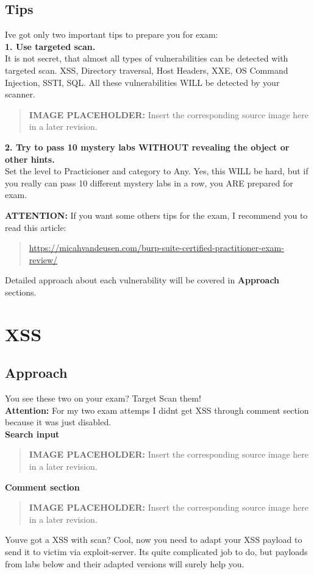 \documentclass[
  letterpaper,
]{article}
\begin{document}
\subsection{Tips}\label{tips}

I\textquotesingle ve got only two important tips to prepare you for
exam:\\
\textbf{1. Use targeted scan.}\\
It is not secret, that almost all types of vulnerabilities can be
detected with targeted scan. XSS, Directory traversal, Host Headers,
XXE, OS Command Injection, SSTI, SQL. All these vulnerabilities WILL be
detected by your scanner.\\
\begin{quote}
\textbf{IMAGE PLACEHOLDER:} Insert the corresponding source image here in a later revision.
\end{quote}
\textbf{2. Try to pass 10 mystery labs WITHOUT revealing the object or
other hints.}\\
Set the level to Practicioner and category to Any. Yes, this WILL be
hard, but if you really can pass 10 different mystery labs in a row, you
ARE prepared for exam.

\textbf{ATTENTION:} If you want some others tips for the exam, I
recommend you to read this article:

\begin{quote}
\url{https://micahvandeusen.com/burp-suite-certified-practitioner-exam-review/}
\end{quote}

Detailed approach about each vulnerability will be covered in
\textbf{Approach} sections.

\section{XSS}\label{xss}

\subsection{Approach}\label{approach}

You see these two on your exam? Target Scan them!\\
\textbf{Attention:} For my two exam attemps I didn\textquotesingle t get
XSS through comment section because it was just disabled.\\
\textbf{Search input}\\
\begin{quote}
\textbf{IMAGE PLACEHOLDER:} Insert the corresponding source image here in a later revision.
\end{quote}
\textbf{Comment section}\\
\begin{quote}
\textbf{IMAGE PLACEHOLDER:} Insert the corresponding source image here in a later revision.
\end{quote}
You\textquotesingle ve got a XSS with scan? Cool, now you need to adapt
your XSS payload to send it to victim via exploit-server.
It\textquotesingle s quite complicated job to do, but payloads from labs
below and their adapted versions will surely help you.
\end{document}
